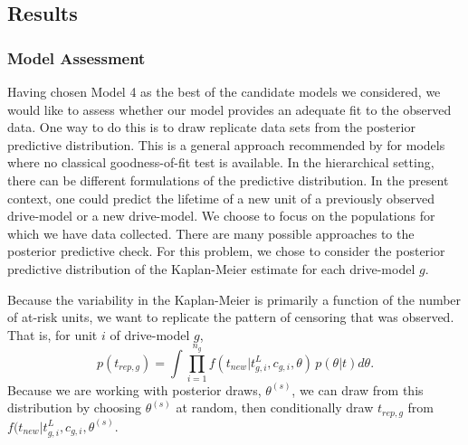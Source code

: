 \documentclass[12pt]{article}
\begin{document}
\subsection{Results}
\subsubsection{Model Assessment}
Having chosen Model 4 as the best of the candidate models we considered, we would like to assess whether our model provides an adequate fit to the observed data. One way to do this is to draw replicate data sets from the posterior predictive distribution. This is a general approach recommended by \citet{gelman1996postpred} for models where no classical goodness-of-fit test is available. In the hierarchical setting, there can be different formulations of the predictive distribution. In the present context, one could predict the lifetime of a new unit of a previously observed drive-model or a new drive-model. We choose to focus on the populations for which we have data collected.
There are many possible approaches to the posterior predictive check. For this problem, we chose to consider the posterior predictive distribution of the Kaplan-Meier estimate for each drive-model $g$.



Because the variability in the Kaplan-Meier is primarily a function of the number of at-risk units, we want to replicate the pattern of censoring that was observed. That is, for unit $i$ of drive-model $g$,
$$p(t_{rep,g}) = \int \prod_{i=1}^{n_g}f(t_{new}|t_{g,i}^L,c_{g,i},\theta)\,p(\theta|t)d\theta.$$
Because we are working with posterior draws, $\theta^{(s)}$, we can draw from this distribution by choosing $\theta^{(s)}$ at random, then conditionally draw $t_{rep,g}$ from $f(t_{new}|t_{g,i}^L,c_{g,i},\theta^{(s)}.$
\end{document}
